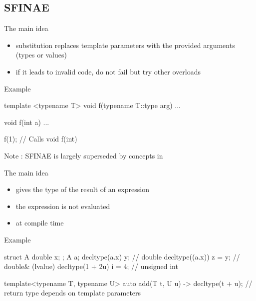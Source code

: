 \subsection[sfinae]{SFINAE}

\begin{frame}[fragile]
  \begin{block}{The main idea}
    \begin{itemize}
    \item substitution replaces template parameters with the provided arguments (types or values)
    \item if it leads to invalid code, do not fail but try other overloads
    \end{itemize}
  \end{block}
  \begin{exampleblock}{Example}
    \begin{cppcode*}{}
      template <typename T>
      void f(typename T::type arg) { ... }

      void f(int a) { ... }

      f(1); // Calls void f(int)
    \end{cppcode*}
  \end{exampleblock}
  Note : SFINAE is largely superseded by concepts in 
\end{frame}

\begin{frame}[fragile]
  \begin{block}{The main idea}
    \begin{itemize}
    \item gives the type of the result of an expression
    \item the expression is not evaluated
    \item at compile time
    \end{itemize}
  \end{block}
  \begin{exampleblock}{Example}
    \begin{cppcode*}{}
      struct A { double x; };
      A a;
      decltype(a.x) y;       // double
      decltype((a.x)) z = y; // double& (lvalue)
      decltype(1 + 2u) i = 4; // unsigned int

      template<typename T, typename U>
      auto add(T t, U u) -> decltype(t + u);
      // return type depends on template parameters
    \end{cppcode*}
  \end{exampleblock}
\end{frame}


